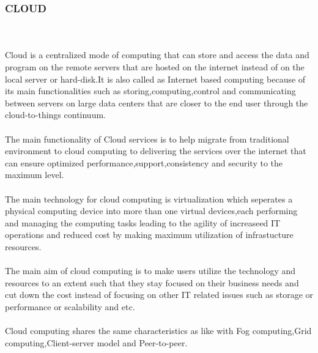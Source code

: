 \subsubsection{CLOUD} 
\hfill\\
\hfill\\
Cloud is a centralized mode of computing that can store and access the data and program on the remote servers that are hosted on the internet instead of on the local server or hard-disk.It is also called as Internet based computing because of its main functionalities such as storing,computing,control and communicating between servers on large data centers that are closer to the end user through the cloud-to-things continuum.\\ \\
The main functionality of Cloud services is to help migrate from traditional environment to cloud computing to delivering the services over the internet that can ensure optimized performance,support,consistency and security to the maximum level.\\ \\
The main technology for cloud computing is virtualization which seperates a physical computing device into more than one virtual devices,each performing and managing the computing tasks leading to the agility of increaseed IT operations and reduced cost by making maximum utilization of infrastucture resources.\\ \\
The main aim of cloud computing is to make users utilize the technology and resources to an extent such that they stay focused on their business needs and cut down the cost instead of focusing on other IT related issues such as storage or performance or scalability and etc.\\ \\
Cloud computing shares the same characteristics as like with Fog computing,Grid computing,Client-server model and Peer-to-peer\cite{10}.\\

